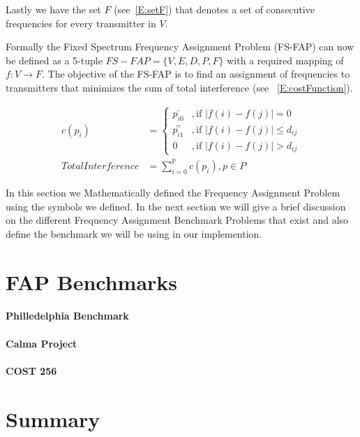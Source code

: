 Lastly we have the set $F$ (see~\ref{E:setF}) that denotes a set of consecutive frequencies for every transmitter in $V$\cite{FAPOrientationModel,TabuMontemanniSmith}.

Formally the Fixed Spectrum Frequency Assignment Problem (FS-FAP) can now be defined as a 5-tuple \(FS-FAP = \{V,E,D,P,F\}\) with a required mapping of \(f: V \rightarrow F\)\cite{TabuMontemanniSmith}. The objective of the FS-FAP is to find an assignment of frequencies to transmitters that minimizes the sum of total interference (see ~\ref{E:costFunction}).

\begin{align} 
 c(p_i) &= 
 \begin{cases}
	\bar{p_{i0}} &,\text{if $|f(i) - f(j)| = 0$}\\
	\overset{=}{p_{i1}} &, \text{if $|f(i) - f(j)| \leqslant d_{ij}$}\\
	0 &,\text{if $|f(i) - f(j)| > d_{ij}$}
 \end{cases}\\
 Total Interference &= \sum^\mathbb{P}_{i = 0}c(p_i),p \in P \label{E:costFunction}
\end{align}

In this section we Mathematically defined the Frequency Assignment Problem using the symbols we defined. In the next section we will give a brief discussion on the different Frequency Assignment Benchmark Problems that exist and also define the benchmark we will be using in our implemention.
\section{FAP Benchmarks}
\label{sec:FAPBenchmarks}
\paragraph{Philledelphia Benchmark}
\paragraph{Calma Project}
\paragraph{COST 256}

\section{Summary}
